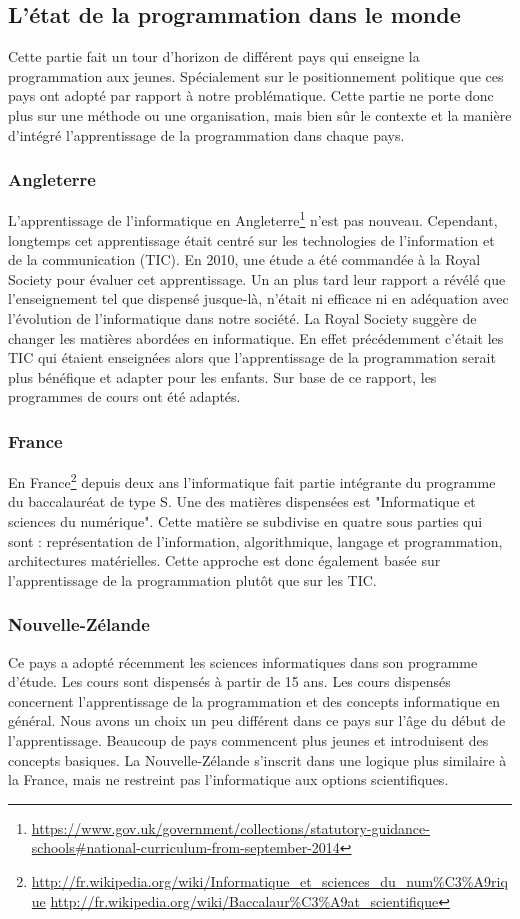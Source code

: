 \subsection{L'état de la programmation dans le monde}
\label{monde}
Cette partie fait un tour d'horizon de différent pays qui enseigne la programmation aux jeunes. Spécialement sur le positionnement politique que ces pays ont adopté par rapport à notre problématique. Cette partie ne porte donc plus sur une méthode ou une organisation, mais bien sûr le contexte et la manière d'intégré l'apprentissage de la programmation dans chaque pays.
\subsubsection{Angleterre}
L'apprentissage de l'informatique en Angleterre\footnote{\url{https://www.gov.uk/government/collections/statutory-guidance-schools\#national-curriculum-from-september-2014}} n'est pas nouveau. Cependant, longtemps cet apprentissage était centré sur les technologies de l'information et de la communication (TIC). En 2010, une étude a été commandée à la Royal Society pour évaluer cet apprentissage. Un an plus tard leur rapport a révélé que l'enseignement tel que dispensé jusque-là, n'était ni efficace ni en adéquation avec l'évolution de l'informatique dans notre société. La Royal Society suggère de changer les matières abordées en informatique. En effet précédemment c'était les TIC qui étaient enseignées alors que l'apprentissage de la programmation serait plus bénéfique et adapter pour les enfants. Sur base de ce rapport, les programmes de cours ont été adaptés.

\subsubsection{France}
En France\footnote{\url{http://fr.wikipedia.org/wiki/Informatique\_et\_sciences\_du\_num\%C3\%A9rique}
\url{http://fr.wikipedia.org/wiki/Baccalaur\%C3\%A9at\_scientifique}} depuis deux ans l'informatique fait partie intégrante du programme du baccalauréat de type S. Une des matières dispensées est "Informatique et sciences du numérique". Cette matière se subdivise en quatre sous parties qui sont : représentation de l'information, algorithmique, langage et programmation, architectures matérielles. Cette approche est donc également basée sur l'apprentissage de la programmation plutôt que sur les TIC.

\subsubsection{Nouvelle-Zélande}
Ce pays a adopté récemment les sciences informatiques dans son programme d'étude. Les cours sont dispensés à partir de 15 ans. Les cours dispensés concernent l'apprentissage de la programmation et des concepts informatique en général. Nous avons un choix un peu différent dans ce pays sur l'âge du début de l'apprentissage. Beaucoup de pays commencent plus jeunes et introduisent des concepts basiques. La Nouvelle-Zélande s'inscrit dans une logique plus similaire à la France, mais ne restreint pas l'informatique aux options scientifiques.


